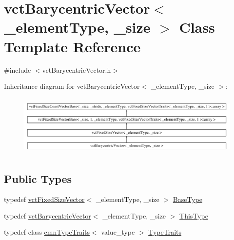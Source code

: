 \hypertarget{classvct_barycentric_vector}{}\section{vct\+Barycentric\+Vector$<$ \+\_\+element\+Type, \+\_\+size $>$ Class Template Reference}
\label{classvct_barycentric_vector}


{\ttfamily \#include $<$vct\+Barycentric\+Vector.\+h$>$}

Inheritance diagram for vct\+Barycentric\+Vector$<$ \+\_\+element\+Type, \+\_\+size $>$\+:\begin{figure}[H]
\begin{center}
\leavevmode
\includegraphics[height=3.111111cm]{d6/def/classvct_barycentric_vector}
\end{center}
\end{figure}
\subsection*{Public Types}
\begin{DoxyCompactItemize}
\item 
typedef \hyperlink{classvct_fixed_size_vector}{vct\+Fixed\+Size\+Vector}$<$ \+\_\+element\+Type, \+\_\+size $>$ \hyperlink{classvct_barycentric_vector_aae25bb56b435677441a223ea76745bfd}{Base\+Type}
\item 
typedef \hyperlink{classvct_barycentric_vector}{vct\+Barycentric\+Vector}$<$ \+\_\+element\+Type, \+\_\+size $>$ \hyperlink{classvct_barycentric_vector_af89123d5c607a28e2328d5d370dffb33}{This\+Type}
\item 
typedef class \hyperlink{classcmn_type_traits}{cmn\+Type\+Traits}$<$ value\+\_\+type $>$ \hyperlink{classvct_barycentric_vector_a7bbb060d2097b44bfa334eb75ebb6493}{Type\+Traits}
\end{DoxyCompactItemize}

